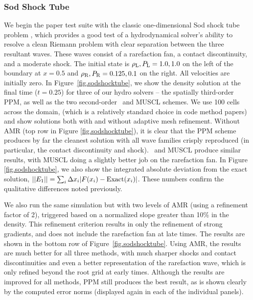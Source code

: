 \subsubsection{Sod Shock Tube}
\label{sec.tests.sodshock}

We begin the paper test suite with the classic one-dimensional Sod shock tube problem
\citep{Sod78}, which provides a good test of a hydrodynamical solver's
ability to resolve a clean Riemann problem with clear separation
between the three resultant waves.  These waves consist of a rarefaction fan, a
contact discontinuity, and a moderate shock.  The initial state is 
$\rho_{\rm L}, P_{\rm L} = 1.0, 1.0$ on the left of the boundary at 
$x=0.5$ and $\rho_{\rm R}, P_{\rm R} = 0.125, 0.1$ on the right.
All velocities are initially zero.  In
Figure~\ref{fig.sodshocktube}, we show the density solution at the
final time ($t=0.25$) for three of our hydro solvers -- the spatially third-order
PPM, as well as the two second-order \zeus\ and MUSCL schemes.  We use
100 cells across the domain, (which is a relatively standard choice in
code method papers) and show solutions both with and without adaptive
mesh refinement.  Without AMR (top row in Figure \ref{fig.sodshocktube}), it is
clear that the PPM scheme produces by far the cleanest solution with
all wave families crisply reproduced (in particular, the contact
discontinuity and shock).  \zeus\ and MUSCL produce similar results,
with MUSCL doing a slightly better job on the rarefaction fan.  In Figure
\ref{fig.sodshocktube}, we also show the integrated absolute deviation from 
the exact solution, $||E_1|| = \sum_i \Delta x_i |F(x_i)-{\rm Exact}(x_i)|$.
These numbers confirm the qualitative differences noted
previously.

We also run the same simulation but with two levels of AMR (using a
refinement factor of 2), triggered based on a normalized slope greater
than 10\% in the density.  This refinement criterion results in only
the refinement of strong gradients, and
does not include the rarefaction fan at late times.  The results are
shown in the bottom row of Figure~\ref{fig.sodshocktube}.  Using AMR,
the results are much better for all three methods, with much sharper
shocks and contact discontinuities and even a better representation of
the rarefaction wave, which is only refined beyond the root grid at
early times.  Although the results are improved for all methods, PPM
still produces the best result, as is shown clearly by the computed
error norms (displayed again in each of the individual panels).

